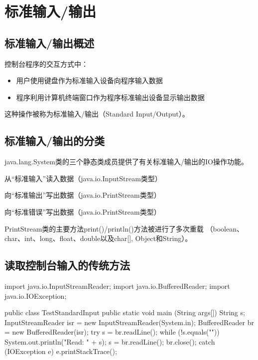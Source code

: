 \section{标准输入/输出}

\subsection{标准输入/输出概述}

控制台程序的交互方式中：

\begin{itemize}
\item 用户使用键盘作为{\hei 标准输入设备}向程序输入数据
\item 程序利用计算机终端窗口作为{\hei 程序标准输出设备}显示输出数据
\end{itemize}

这种操作被称为{\hei 标准输入/输出（Standard Input/Output）}。

\subsection{标准输入/输出的分类}

java.lang.System类的三个静态类成员提供了有关标准输入/输出的IO操作功能。

\begin{description}\kai
\item [System.in] 从“标准输入”读入数据（java.io.InputStream类型）
\item [System.out] 向“标准输出”写出数据（java.io.PrintStream类型）
\item [System.err] 向“标准错误”写出数据（java.io.PrintStream类型）
\end{description}

PrintStream类的主要方法print()/println()方法被进行了多次重载
（boolean、char、int、long、float、double以及char[], Object和String）。

\subsection{读取控制台输入的传统方法}

\begin{javaCode}
  import java.io.InputStreamReader; 
  import java.io.BufferedReader; 
  import java.io.IOException;

  public class TestStandardInput {
    public static void main (String args[]) {
      String s;
      InputStreamReader isr = new InputStreamReader(System.in); 
      BufferedReader br = new BufferedReader(isr);
      try {
        s = br.readLine(); 
        while (!s.equals("")) {
          System.out.println("Read: " + s);
          s = br.readLine(); 
        }
        br.close();
      } catch (IOException e) {
        e.printStackTrace(); 
      }
    } 
  }  
\end{javaCode}

